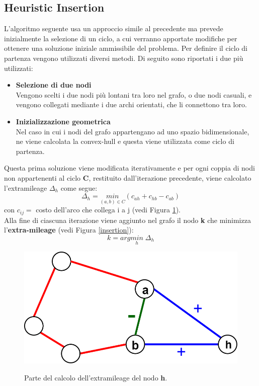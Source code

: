 \subsection{Heuristic Insertion}
L'algoritmo seguente usa un approccio simile al precedente ma prevede inizialmente la selezione di un ciclo, a cui verranno apportate modifiche per ottenere una soluzione iniziale ammissibile del problema. Per definire il ciclo di partenza vengono utilizzati diversi metodi. Di seguito sono riportati i due più utilizzati:
\begin{itemize}
\item{\textbf{Selezione di due nodi}\\
Vengono scelti i due nodi più lontani tra loro nel grafo, o due nodi casuali, e vengono collegati mediante i due archi orientati, che li connettono tra loro.
}
\item{\textbf{Inizializzazione geometrica}\\
Nel caso in cui i nodi del grafo appartengano ad uno spazio bidimensionale, ne viene calcolata la convex-hull e questa viene utilizzata come ciclo di partenza.
}
\end{itemize}
Questa prima soluzione viene modificata iterativamente e per ogni coppia di nodi non appartenenti al ciclo \textbf{C}, restituito dall'iterazione precedente, viene calcolato l'extramileage $\Delta_h$ come segue:
$$\Delta_h = \underset{(a,b)\in C}{min} (c_{ah}+c_{hb}-c_{ab})$$
con $c_{ij}=$ costo dell'arco che collega i a j (vedi Figura \ref{partial_cycle}).\\
Alla fine di ciascuna iterazione viene aggiunto nel grafo il nodo \textbf{k} che minimizza l'\textbf{extra-mileage} (vedi Figura \ref{insertion}):\\
$$k = arg\underset{h}{min}\;\Delta_{h}$$
\begin{figure}[H] 
\begin{center} 
  \includegraphics[scale=0.2]{Images/partial_cycle}\\ 
  \caption{\footnotesize{Parte del calcolo dell'extramileage del nodo \textbf{h}.}}
  \label{partial_cycle}
\end{center}
\end{figure}
